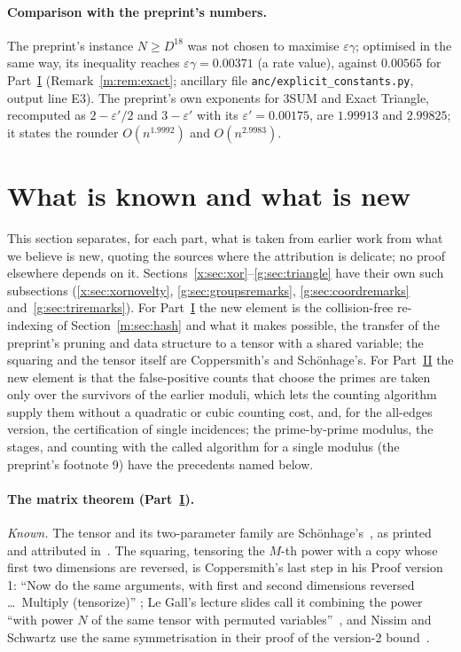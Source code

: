 \documentclass[11pt]{article}
\theoremstyle{definition}
\theoremstyle{remark}
\begin{document}
\paragraph{Comparison with the preprint's numbers.} The preprint's instance $N\ge D^{18}$ was not chosen to maximise $\varepsilon\gamma$; optimised in the same way, its inequality reaches $\varepsilon\gamma=0.00371$ (a rate value), against $0.00565$ for Part~\hyperref[m:partI]{I} (Remark~\ref{m:rem:exact}; ancillary file \texttt{anc/explicit\_constants.py}, output line E3). The preprint's own exponents for 3SUM and Exact Triangle, recomputed as $2-\varepsilon'/2$ and $3-\varepsilon'$ with its $\varepsilon'=0.00175$, are $1.99913$ and $2.99825$; it states the rounder $O(n^{1.9992})$ and $O(n^{2.9983})$.

\section{What is known and what is new}\label{x:sec:novelty}

This section separates, for each part, what is taken from earlier work from what we believe is new, quoting the sources where the attribution is delicate; no proof elsewhere depends on it. Sections~\ref{x:sec:xor}--\ref{g:sec:triangle} have their own such subsections (\ref{x:sec:xornovelty}, \ref{g:sec:groupsremarks}, \ref{g:sec:coordremarks} and~\ref{g:sec:triremarks}). For Part~\hyperref[m:partI]{I} the new element is the collision-free re-indexing of Section~\ref{m:sec:hash} and what it makes possible, the transfer of the preprint's pruning and data structure to a tensor with a shared variable; the squaring and the tensor itself are Coppersmith's and Schönhage's. For Part~\hyperref[m:partII]{II} the new element is that the false-positive counts that choose the primes are taken only over the survivors of the earlier moduli, which lets the counting algorithm supply them without a quadratic or cubic counting cost, and, for the all-edges version, the certification of single incidences; the prime-by-prime modulus, the stages, and counting with the called algorithm for a single modulus (the preprint's footnote 9) have the precedents named below.

\paragraph{The matrix theorem (Part~\hyperref[m:partI]{I}).} \emph{Known.} The tensor and its two-parameter family are Schönhage's~\cite{Sch81}, as printed and attributed in~\cite[p.~467 and Remarks on p.~469]{Cop82}. The squaring, tensoring the $M$-th power with a copy whose first two dimensions are reversed, is Coppersmith's last step in his Proof version 1: ``Now do the same arguments, with first and second dimensions reversed \ldots\ Multiply (tensorize)'' \cite[p.~469]{Cop82}; Le Gall's lecture slides call it combining the power ``with power $N$ of the same tensor with permuted variables''~\cite{LG17}, and Nissim and Schwartz use the same symmetrisation in their proof of the version-2 bound~\cite{NS24}.
\end{document}
